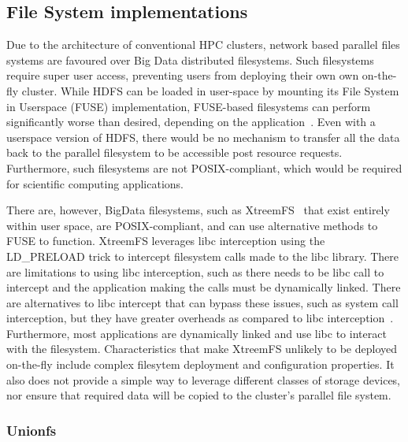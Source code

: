 \documentclass[10pt,journal,compsoc]{IEEEtran}
\begin{document}
\subsection{File System implementations}
      Due to the architecture of conventional HPC clusters, network based parallel
      files systems are favoured over Big Data distributed filesystems. Such filesystems
      require super user access, preventing users from deploying their own own on-the-fly cluster.
      While HDFS can be loaded in user-space by mounting its File System in Userspace (FUSE) implementation,
      FUSE-based filesystems can perform significantly worse than desired, depending on the application~\cite{tofuse}.
      Even with a userspace version of HDFS, there would
      be no mechanism to transfer all the data back to the parallel filesystem to be accessible
      post resource requests. Furthermore, such filesystems are not POSIX-compliant, which
      would be required for scientific computing applications.
      
      There are, however, BigData filesystems, such as XtreemFS~\cite{xtreemfs} that
      exist entirely within user space, are POSIX-compliant, and can use alternative
      methods to FUSE to function. XtreemFS leverages libc interception using the LD\_PRELOAD
      trick to intercept filesystem calls made to the libc library. There are
      limitations to using libc interception, such as there needs to be libc call to intercept and the
      application making the calls must be dynamically linked.
      There are alternatives to libc intercept that can bypass these issues, such as
      system call interception, but they have greater overheads as compared to libc interception~\cite{quinson}.
      Furthermore, most applications are dynamically linked and use libc to interact
      with the filesystem. Characteristics that make XtreemFS unlikely to be deployed
      on-the-fly include complex filesytem deployment and configuration properties. It
      also does not provide a simple way to leverage different classes of storage
      devices, nor ensure that required data will be copied to the cluster's parallel file system.
\subsubsection{Unionfs}
\end{document}
